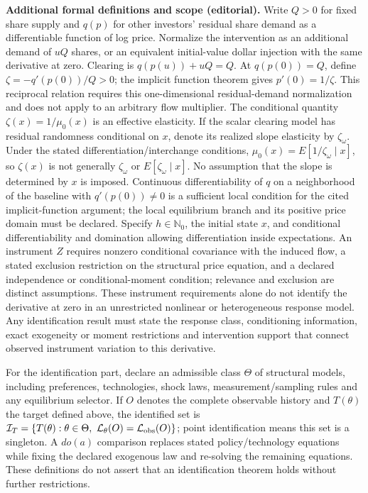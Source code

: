 \documentclass[11pt,a4paper]{article}
\begin{document}
\textbf{Additional formal definitions and scope (editorial).} Write \(Q>0\) for fixed share supply and \(q(p)\) for other investors' residual share demand as a differentiable function of log price. Normalize the intervention as an additional demand of \(uQ\) shares, or an equivalent initial-value dollar injection with the same derivative at zero. Clearing is \(q(p(u))+uQ=Q\). At \(q(p(0))=Q\), define \(\zeta=-q'(p(0))/Q>0\); the implicit function theorem gives \(p'(0)=1/\zeta\). This reciprocal relation requires this one-dimensional residual-demand normalization and does not apply to an arbitrary flow multiplier. The conditional quantity \(\zeta(x)=1/\mu_0(x)\) is an effective elasticity. If the scalar clearing model has residual randomness conditional on \(x\), denote its realized slope elasticity by \(\zeta_\omega\). Under the stated differentiation/interchange conditions, \(\mu_0(x)=E[1/\zeta_\omega\mid x]\), so \(\zeta(x)\) is not generally \(\zeta_\omega\) or \(E[\zeta_\omega\mid x]\). No assumption that the slope is determined by \(x\) is imposed. Continuous differentiability of \(q\) on a neighborhood of the baseline with \(q'(p(0))\ne0\) is a sufficient local condition for the cited implicit-function argument; the local equilibrium branch and its positive price domain must be declared. Specify \(h\in\mathbb N_0\), the initial state \(x\), and conditional differentiability and domination allowing differentiation inside expectations. An instrument \(Z\) requires nonzero conditional covariance with the induced flow, a stated exclusion restriction on the structural price equation, and a declared independence or conditional-moment condition; relevance and exclusion are distinct assumptions. These instrument requirements alone do not identify the derivative at zero in an unrestricted nonlinear or heterogeneous response model. Any identification result must state the response class, conditioning information, exact exogeneity or moment restrictions and intervention support that connect observed instrument variation to this derivative.

For the identification part, declare an admissible class \(\Theta\) of structural models, including preferences, technologies, shock laws, measurement/sampling rules and any equilibrium selector. If \(O\) denotes the complete observable history and \(T(\theta)\) the target defined above, the identified set is \(\mathcal I_T=\{T(\theta):\theta\in\Theta,\ \mathcal L_\theta(O)=\mathcal L_{\rm obs}(O)\}\); point identification means this set is a singleton. A \(do(a)\) comparison replaces stated policy/technology equations while fixing the declared exogenous law and re-solving the remaining equations. These definitions do not assert that an identification theorem holds without further restrictions.
\end{document}
